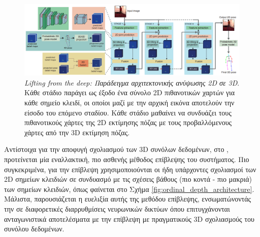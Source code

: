 \begin{figure}[h]
    \centering
    \includegraphics[scale=0.3]{images/chapter2/3d_pose_estimation/lifting_from_the_deep_architecture.png}
    \caption[Lifting from the deep: Παράδειγμα αρχιτεκτονικής ανύψωσης 2D σε 3D]{\textsl{Lifting from the deep: Παράδειγμα αρχιτεκτονικής ανύψωσης 2D σε 3D}. Κάθε στάδιο παράγει ως έξοδο ένα σύνολο 2D πιθανοτικών χαρτών για κάθε σημείο κλειδί, οι οποίοι μαζί με την αρχική εικόνα αποτελούν την είσοδο του επόμενο σταδίου. Κάθε στάδιο μαθαίνει να συνδυάζει τους πιθανοτικούς χάρτες της 2D εκτίμησης πόζας με τους προβαλλόμενους χάρτες από την 3D εκτίμηση πόζας.}
    \label{fig:lifting_from_the_deep_architecture}
\end{figure}

Αντίστοιχα για την αποφυγή σχολιασμού των 3D συνόλων δεδομένων, στο \cite{ordinal_depth_supervision}, προτείνεται μία εναλλακτική, πιο ασθενής μέθοδος επίβλεψης του συστήματος. Πιο συγκεκριμένα, για την επίβλεψη χρησιμοποιούνται οι ήδη υπάρχοντες σχολιασμοί των 2D σημείων κλειδιών σε συνδυασμό με τις σχέσεις βάθους (πιο κοντά - πιο μακριά) των σημείων κλειδιών, όπως φαίνεται στο Σχήμα \ref{fig:ordinal_depth_architecture}. Μάλιστα, παρουσιάζεται η ευελιξία αυτής της μεθόδου επίβλεψης, ενσωματώνοντάς την σε διαφορετικές διαρρυθμίσεις νευρωνικών δικτύων όπου επιτυγχάνονται ανταγωνιστικά αποτελέσματα με την επίβλεψη με πραγματικούς 3D σχολιασμούς του συνόλου δεδομένων.
 
